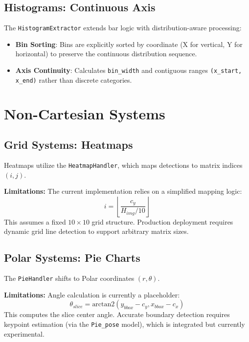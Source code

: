 \documentclass[11pt, a4paper]{report}
\begin{document}
\section{Histograms: Continuous Axis}
The \texttt{HistogramExtractor} extends bar logic with distribution-aware processing:
\begin{itemize}
    \item \textbf{Bin Sorting}: Bins are explicitly sorted by coordinate (X for vertical, Y for horizontal) to preserve the continuous distribution sequence.
    \item \textbf{Axis Continuity}: Calculates \texttt{bin\_width} and contiguous ranges \texttt{(x\_start, x\_end)} rather than discrete categories.
\end{itemize}

\chapter{Non-Cartesian Systems}

\section{Grid Systems: Heatmaps}
Heatmaps utilize the \texttt{HeatmapHandler}, which maps detections to matrix indices $(i, j)$.

\textbf{Limitations:} The current implementation relies on a simplified mapping logic:
\begin{equation}
    i = \left\lfloor \frac{c_y}{H_{img} / 10} \right\rfloor
\end{equation}
This assumes a fixed $10 \times 10$ grid structure. Production deployment requires dynamic grid line detection to support arbitrary matrix sizes.

\section{Polar Systems: Pie Charts}
The \texttt{PieHandler} shifts to Polar coordinates $(r, \theta)$.

\textbf{Limitations:} Angle calculation is currently a placeholder:
\begin{equation}
    \theta_{slice} = \text{arctan2}(y_{bbox} - c_y, x_{bbox} - c_x)
\end{equation}
This computes the slice center angle. Accurate boundary detection requires keypoint estimation (via the \texttt{Pie\_pose} model), which is integrated but currently experimental.
\end{document}
